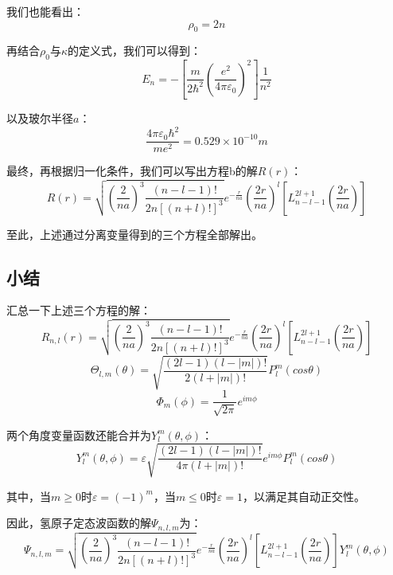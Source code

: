 我们也能看出：
\[\rho_0=2n\]

再结合$\rho_0$与$\kappa$的定义式，我们可以得到：
\[E_n=- \left [\frac{m}{2\hbar^2} \left ( \frac{e^2}{4 \pi \varepsilon_0} \right )^2 \right ] \frac{1}{n^2}\]

以及玻尔半径$a$：
\[\frac{4 \pi \varepsilon_0 \hbar^2}{me^2}=0.529 \times 10^{-10}m\]

最终，再根据归一化条件，我们可以写出方程b的解$R(r)$：
\[R(r)=\sqrt{ \left (\frac{2}{na} \right )^3 \frac{(n-l-1)!}{2n[(n+l)!]^3}}e^{-\frac{r}{na}}\left (\frac{2r}{na} \right )^l \left [L_{n-l-1}^{2l+1} \left ( \frac{2r}{na} \right ) \right ]\]

至此，上述通过分离变量得到的三个方程全部解出。

\subsection{小结}
汇总一下上述三个方程的解：
\[R_{n,l}(r)=\sqrt{ \left (\frac{2}{na} \right )^3 \frac{(n-l-1)!}{2n[(n+l)!]^3}}e^{-\frac{r}{na}}\left (\frac{2r}{na} \right )^l \left [L_{n-l-1}^{2l+1} \left ( \frac{2r}{na} \right ) \right ]\]
\[\Theta_{l,m}(\theta)=\sqrt{\frac{(2l-1)(l-|m|)!}{2(l+|m|)!}}P^{m}_l(cos\theta)\]
\[\varPhi_{m}(\phi)=\frac{1}{\sqrt{2\pi}}e^{im\phi}\]

两个角度变量函数还能合并为$Y_l^m(\theta,\phi)$：
\[Y_l^m(\theta,\phi)=\varepsilon \sqrt{\frac{(2l-1)(l-|m|)!}{4 \pi (l+|m|)!}}e^{im\phi}P^{m}_l(cos\theta)\]

其中，当$m \geq 0$时$\varepsilon=(-1)^m$，当$m \leq 0$时$\varepsilon=1$，以满足其自动正交性。

因此，氢原子定态波函数的解$\varPsi_{n,l,m}$为：
\[\varPsi_{n,l,m}=\sqrt{ \left (\frac{2}{na} \right )^3 \frac{(n-l-1)!}{2n[(n+l)!]^3}}e^{-\frac{r}{na}}\left (\frac{2r}{na} \right )^l \left [L_{n-l-1}^{2l+1} \left ( \frac{2r}{na} \right ) \right ]Y_l^m(\theta,\phi)\]